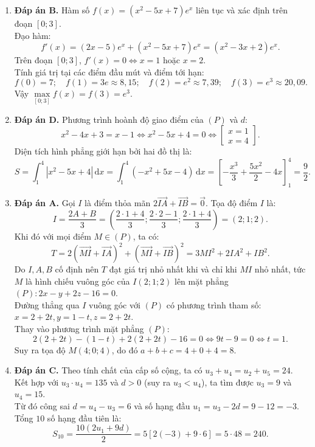 \documentclass[12pt,a4paper]{article}
\begin{document}
\begin{enumerate}[label=\textbf{Câu \arabic*:}, leftmargin=*]
\item \textbf{Đáp án B.}
Hàm số $f(x) = (x^2 - 5x + 7)e^x$ liên tục và xác định trên đoạn $[0; 3]$.\\
Đạo hàm:
$$f'(x) = (2x - 5)e^x + (x^2 - 5x + 7)e^x = (x^2 - 3x + 2)e^x.$$
Trên đoạn $[0; 3]$, $f'(x) = 0 \iff x = 1$ hoặc $x = 2$.\\
Tính giá trị tại các điểm đầu mút và điểm tới hạn:
$$f(0) = 7; \quad f(1) = 3e \approx 8{,}15; \quad f(2) = e^2 \approx 7{,}39; \quad f(3) = e^3 \approx 20{,}09.$$
Vậy $\max\limits_{[0; 3]} f(x) = f(3) = e^3$.

\item \textbf{Đáp án D.}
Phương trình hoành độ giao điểm của $(P)$ và $d$:
$$x^2 - 4x + 3 = x - 1 \iff x^2 - 5x + 4 = 0 \iff \begin{bmatrix} x = 1 \\ x = 4 \end{bmatrix}.$$
Diện tích hình phẳng giới hạn bởi hai đồ thị là:
$$S = \int_1^4 \left|x^2 - 5x + 4\right|\,\mathrm{d}x = \int_1^4 (-x^2 + 5x - 4)\,\mathrm{d}x = \left[ -\dfrac{x^3}{3} + \dfrac{5x^2}{2} - 4x \right]_1^4 = \dfrac{9}{2}.$$

\item \textbf{Đáp án A.}
Gọi $I$ là điểm thỏa mãn $2\overrightarrow{IA} + \overrightarrow{IB} = \vec{0}$. Tọa độ điểm $I$ là:
$$I = \dfrac{2A + B}{3} = \left(\dfrac{2\cdot 1 + 4}{3}; \dfrac{2\cdot 2 - 1}{3}; \dfrac{2\cdot 1 + 4}{3}\right) = (2; 1; 2).$$
Khi đó với mọi điểm $M \in (P)$, ta có:
$$T = 2\left(\overrightarrow{MI} + \overrightarrow{IA}\right)^2 + \left(\overrightarrow{MI} + \overrightarrow{IB}\right)^2 = 3MI^2 + 2IA^2 + IB^2.$$
Do $I, A, B$ cố định nên $T$ đạt giá trị nhỏ nhất khi và chỉ khi $MI$ nhỏ nhất, tức $M$ là hình chiếu vuông góc của $I(2; 1; 2)$ lên mặt phẳng $(P): 2x - y + 2z - 16 = 0$.\\
Đường thẳng qua $I$ vuông góc với $(P)$ có phương trình tham số: $x = 2 + 2t, y = 1 - t, z = 2 + 2t$.\\
Thay vào phương trình mặt phẳng $(P)$:
$$2(2 + 2t) - (1 - t) + 2(2 + 2t) - 16 = 0 \iff 9t - 9 = 0 \iff t = 1.$$
Suy ra tọa độ $M(4; 0; 4)$, do đó $a + b + c = 4 + 0 + 4 = 8$.

\item \textbf{Đáp án C.}
Theo tính chất của cấp số cộng, ta có $u_3 + u_4 = u_2 + u_5 = 24$.\\
Kết hợp với $u_3 \cdot u_4 = 135$ và $d > 0$ (suy ra $u_3 < u_4$), ta tìm được $u_3 = 9$ và $u_4 = 15$.\\
Từ đó công sai $d = u_4 - u_3 = 6$ và số hạng đầu $u_1 = u_3 - 2d = 9 - 12 = -3$.\\
Tổng $10$ số hạng đầu tiên là:
$$S_{10} = \dfrac{10\left(2u_1 + 9d\right)}{2} = 5\left[2(-3) + 9\cdot 6\right] = 5 \cdot 48 = 240.$$


\end{enumerate}
\end{document}
